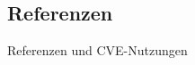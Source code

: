 \subsection{Referenzen} \label{subsec:Referenzen}
    Referenzen und \ac{CVE}-Nutzungen
    
    
    
